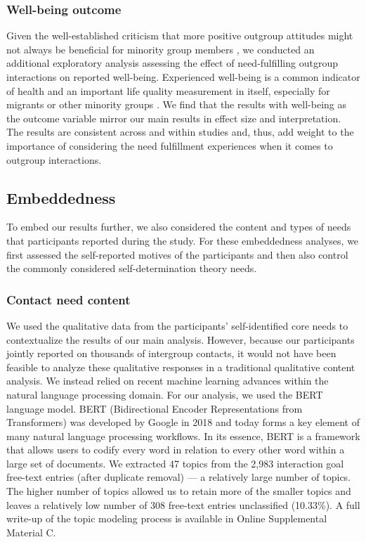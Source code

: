 \subsubsection{Well-being outcome}

Given the well-established criticism that more positive outgroup
attitudes might not always be beneficial for minority group members
\citep[e.g.,][]{reimer2023}, we conducted an additional exploratory
analysis assessing the effect of need-fulfilling outgroup interactions
on reported well-being. Experienced well-being is a common indicator of
health and an important life quality measurement in itself, especially
for migrants or other minority groups \citep[e.g.,][]{bhugra2011}. We
find that the results with well-being as the outcome variable mirror our
main results in effect size and interpretation. The results are
consistent across and within studies and, thus, add weight to the
importance of considering the need fulfillment experiences when it comes
to outgroup interactions.

\subsection{Embeddedness}

To embed our results further, we also considered the content and types
of needs that participants reported during the study. For these
embeddedness analyses, we first assessed the self-reported motives of
the participants and then also control the commonly considered
self-determination theory needs.

\subsubsection{Contact need content}

We used the qualitative data from the participants' self-identified core
needs to contextualize the results of our main analysis. However,
because our participants jointly reported on thousands of intergroup
contacts, it would not have been feasible to analyze these qualitative
responses in a traditional qualitative content analysis. We instead
relied on recent machine learning advances within the natural language
processing domain. For our analysis, we used the BERT language model.
BERT (Bidirectional Encoder Representations from Transformers) was
developed by Google in 2018 and today forms a key element of many
natural language processing workflows. In its essence, BERT is a
framework that allows users to codify every word in relation to every
other word within a large set of documents. We extracted 47 topics from
the 2,983 interaction goal free-text entries (after duplicate removal)
--- a relatively large number of topics. The higher number of topics
allowed us to retain more of the smaller topics and leaves a relatively
low number of 308 free-text entries unclassified (10.33\%). A full
write-up of the topic modeling process is available in Online
Supplemental Material C.

